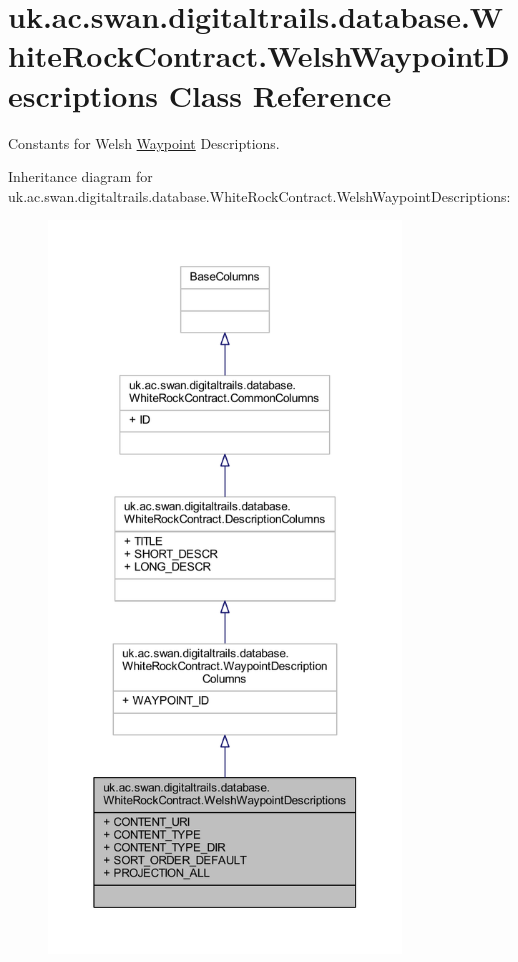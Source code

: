 \hypertarget{classuk_1_1ac_1_1swan_1_1digitaltrails_1_1database_1_1_white_rock_contract_1_1_welsh_waypoint_descriptions}{\section{uk.\+ac.\+swan.\+digitaltrails.\+database.\+White\+Rock\+Contract.\+Welsh\+Waypoint\+Descriptions Class Reference}
\label{classuk_1_1ac_1_1swan_1_1digitaltrails_1_1database_1_1_white_rock_contract_1_1_welsh_waypoint_descriptions}
}


Constants for Welsh \hyperlink{classuk_1_1ac_1_1swan_1_1digitaltrails_1_1database_1_1_white_rock_contract_1_1_waypoint}{Waypoint} Descriptions.  




Inheritance diagram for uk.\+ac.\+swan.\+digitaltrails.\+database.\+White\+Rock\+Contract.\+Welsh\+Waypoint\+Descriptions\+:
\nopagebreak
\begin{figure}[H]
\begin{center}
\leavevmode
\includegraphics[height=550pt]{classuk_1_1ac_1_1swan_1_1digitaltrails_1_1database_1_1_white_rock_contract_1_1_welsh_waypoint_descriptions__inherit__graph}
\end{center}
\end{figure}


